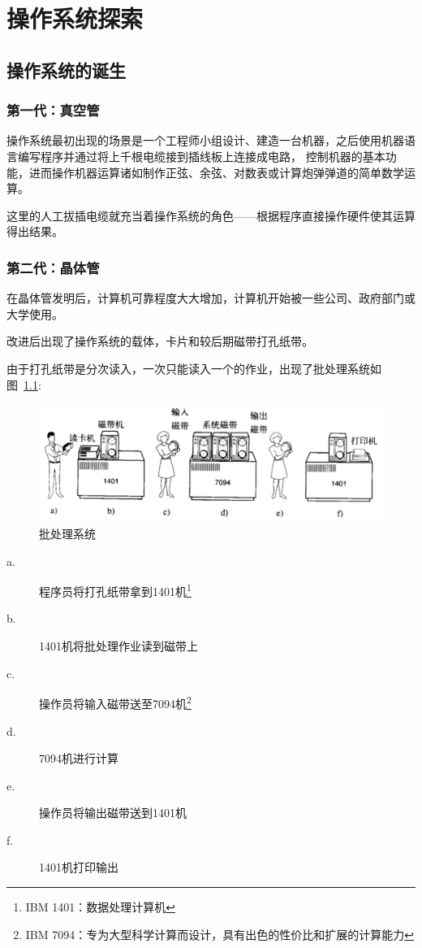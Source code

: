 \chapter{操作系统探索}

\section{操作系统的诞生}

\subsection{第一代：真空管}

操作系统最初出现的场景是一个工程师小组设计、建造一台机器，之后使用机器语言编写程序并通过将上千根电缆接到插线板上连接成电路，
控制机器的基本功能，进而操作机器运算诸如制作正弦、余弦、对数表或计算炮弹弹道的简单数学运算。

这里的人工拔插电缆就充当着操作系统的角色——根据程序直接操作硬件使其运算得出结果。


\subsection{第二代：晶体管}

在晶体管发明后，计算机可靠程度大大增加，计算机开始被一些公司、政府部门或大学使用。

改进后出现了操作系统的载体，卡片和较后期磁带打孔纸带。

由于打孔纸带是分次读入，一次只能读入一个的作业，出现了批处理系统如图~\ref{fig:btss}: 

\begin{figure}[h]
  \centering
  \includegraphics[width=.8\textwidth]{../Fig/btss.png}
  \caption{批处理系统}
  \label{fig:btss}
\end{figure}

\begin{description}
\item[a.]程序员将打孔纸带拿到1401机\footnote{IBM 1401：数据处理计算机\cite{1401dps}}
\item[b.]1401机将批处理作业读到磁带上
\item[c.]操作员将输入磁带送至7094机\footnote{IBM 7094：专为大型科学计算而设计，具有出色的性价比和扩展的计算能力\cite{7094dps}}
\item[d.]7094机进行计算
\item[e.]操作员将输出磁带送到1401机
\item[f.]1401机打印输出
\end{description}

